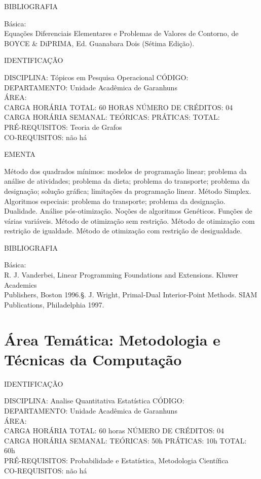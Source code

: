 \documentclass[
	12pt,				%
	openright,			%
  oneside,     %
	a4paper,			%
	english,			%
	french,				%
	spanish,			%
	brazil				%
	]{abntex2}
\begin{document}
\begin{apendicesenv}
BIBLIOGRAFIA 

Básica:\\
Equações Diferenciais Elementares e Problemas de Valores de
Contorno, de BOYCE \& DiPRIMA, Ed. Guanabara Dois (Sétima Edição).

\newpage IDENTIFICAÇÃO

DISCIPLINA: Tópicos em Pesquisa Operacional CÓDIGO:\\ 
DEPARTAMENTO: Unidade Acadêmica de Garanhuns\\ 
ÁREA: \\
CARGA HORÁRIA TOTAL: 60 HORAS NÚMERO DE CRÉDITOS: 04\\
CARGA HORÁRIA SEMANAL: TEÓRICAS: PRÁTICAS: TOTAL: \\
PRÉ-REQUISITOS: Teoria de Grafos\\
CO-REQUISITOS: não há

EMENTA 

Método dos quadrados mínimos: modelos de programação linear; problema da análise de atividades; problema da dieta; problema do transporte; problema da designação; solução gráfica; limitações da programação linear. Método Simplex. Algoritmos especiais: problema do transporte; problema da designação. Dualidade. Análise pós-otimização. Noções de algoritmos Genéticos. Funções de várias variáveis. Método de otimização sem restrição. Método de otimização com restrição de igualdade. Método de otimização com restrição de desigualdade. 

BIBLIOGRAFIA 

Básica:\\
R. J. Vanderbei, Linear Programming  Foundations and Extensions.
Kluwer Academics\\
Publishers, Boston 1996.\S. J. Wright, Primal-Dual Interior-Point Methods. SIAM Publications,
Philadelphia 1997. 
\newpage

\section*{Área Temática: Metodologia e Técnicas da Computação}

IDENTIFICAÇÃO

DISCIPLINA: Analise Quantitativa Estatística CÓDIGO: \\
DEPARTAMENTO: Unidade Acadêmica de Garanhuns \\
ÁREA: \\
CARGA HORÁRIA TOTAL: 60 horas NÚMERO DE CRÉDITOS: 04\\
CARGA HORÁRIA SEMANAL: TEÓRICAS: 50h PRÁTICAS: 10h TOTAL: 60h\\
PRÉ-REQUISITOS: Probabilidade e Estatística, Metodologia Científica\\
CO-REQUISITOS: não há


\end{apendicesenv}
\end{document}

